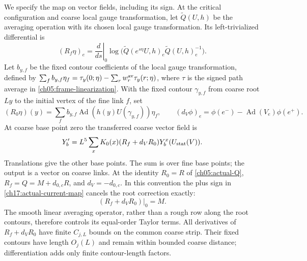 We specify the map on vector fields, including its sign. At the critical
configuration and coarse local gauge transformation, let $\widetilde Q(U,h)$ be the
averaging operation with its chosen local gauge transformation. Its left-trivialized differential is
\[
 (R_f\eta)_e=\left.\frac d{ds}\right|_0
 \log\bigl(\widetilde Q(e^{s\eta}U,h)_e
                              \widetilde Q(U,h)_e^{-1}\bigr).
\]
Let $b_{y,f}$ be the fixed contour coefficients of the local gauge transformation, defined by
$\sum_f b_{y,f}\eta_f=\tau_y(0;\eta)-\sum_rw_r^{\rm av}\tau_y(r;\eta)$,
where $\tau$ is the signed path average in
\eqref{ch05:frame-linearization}. With the fixed contour $\gamma_{y,f}$
from coarse root $Ly$ to the initial vertex of the fine link $f$, set
\[
 (R_0\eta)(y)=\sum_f b_{y,f}
             \operatorname{Ad}(h(y)U(\gamma_{y,f}))\eta_f,
 \qquad (d_V\phi)_e=\phi(e^-)-\operatorname{Ad}(V_e)\phi(e^+).
\]
At coarse base point zero the transferred coarse vector field is
\begin{equation}
 Y'_b=L^5\sum_xK_0(x)(R_f+d_VR_0)
                              Y_b^x(U_{\rm stat}(V)).
 \label{ch17:actual-current-map}
\end{equation}
Translations give the other base points. The sum is over fine base points;
the output is a vector on coarse links. At the identity $R_0=R$ of
\eqref{ch05:actual-Q}, $R_f=Q=M+d_{0,c}R$, and
$d_V=-d_{0,c}$. In this convention the plus sign in
\eqref{ch17:actual-current-map} cancels the root correction exactly:
\begin{equation}
                         (R_f+d_VR_0)|_{0}=M.
 \label{ch17:flat-current-map}
\end{equation}
The smooth linear averaging operator, rather than a rough row along the root contours,
therefore controls its equal-order Taylor terms. All derivatives of
$R_f+d_VR_0$ have finite $C_{j,L}$ bounds on the common coarse strip.
Their fixed contours have length $O_j(L)$ and remain within bounded
coarse distance; differentiation adds only finite contour-length factors.

